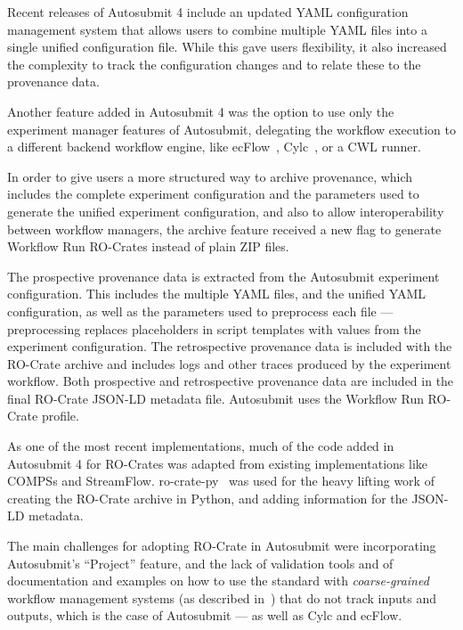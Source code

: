 \documentclass[10pt,letterpaper]{article}
\begin{document}
Recent releases of Autosubmit 4 include an updated YAML configuration management system that allows users to combine multiple YAML files into a single unified configuration file.
While this gave users flexibility, it also increased the complexity to track the configuration changes and to relate these to the provenance data.

Another feature added in Autosubmit 4 was the option to use only the experiment manager features of Autosubmit, delegating the workflow execution to a different backend workflow engine, like ecFlow~\cite{Bahra 2011}, Cylc~\cite{Oliver 2023}, or a CWL runner.

In order to give users a more structured way to archive provenance, which includes the complete experiment configuration and the parameters used to generate the unified experiment configuration, and also to allow interoperability between workflow managers, the archive feature received a new flag to generate Workflow Run RO-Crates instead of plain ZIP files.

The prospective provenance data is extracted from the Autosubmit experiment configuration.
This includes the multiple YAML files, and the unified YAML configuration, as well as the parameters used to preprocess each file --- preprocessing replaces placeholders in script templates with values from the experiment configuration.
The retrospective provenance data is included with the RO-Crate archive and includes logs and other traces produced by the experiment workflow.
Both prospective and retrospective provenance data are included in the final RO-Crate JSON-LD metadata file. Autosubmit uses the Workflow Run RO-Crate profile.

As one of the most recent implementations, much of the code added in Autosubmit 4 for RO-Crates was adapted from existing implementations like COMPSs and StreamFlow.
ro-crate-py~\cite{De Geest 2022a} was used for the heavy lifting work of creating the RO-Crate archive in Python, and adding information for the JSON-LD metadata.

The main challenges for adopting RO-Crate in Autosubmit were incorporating Autosubmit's ``Project'' feature, and the lack of validation tools and of documentation and examples on how to use the standard with \emph{coarse-grained} workflow management systems (as described in~\cite{Goble 2020}) that do not track inputs and outputs, which is the case of Autosubmit --- as well as Cylc and ecFlow.
\end{document}
